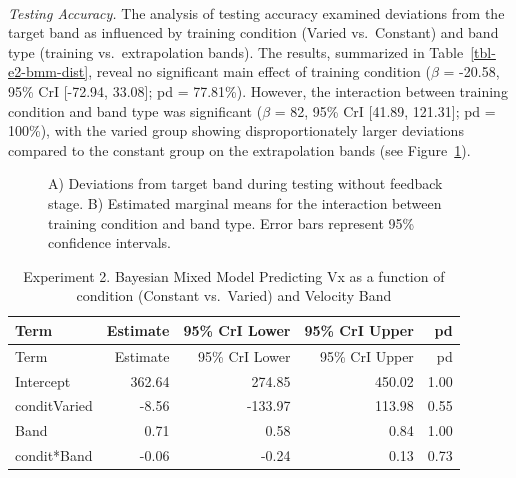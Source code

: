 \documentclass[
  12pt,
  letterpaper,
]{article}
\begin{document}
~\\

\emph{Testing Accuracy.} The analysis of testing accuracy examined
deviations from the target band as influenced by training condition
(Varied vs.~Constant) and band type (training vs.~extrapolation bands).
The results, summarized in Table~\ref{tbl-e2-bmm-dist}, reveal no
significant main effect of training condition (\(\beta\) = -20.58, 95\%
CrI {[}-72.94, 33.08{]}; pd = 77.81\%). However, the interaction between
training condition and band type was significant (\(\beta\) = 82, 95\%
CrI {[}41.89, 121.31{]}; pd = 100\%), with the varied group showing
disproportionately larger deviations compared to the constant group on
the extrapolation bands (see Figure~\ref{fig-e2-test-dev}).

\begin{figure}


\caption{\label{fig-e2-test-dev}A) Deviations from target band during
testing without feedback stage. B) Estimated marginal means for the
interaction between training condition and band type. Error bars
represent 95\% confidence intervals.}

\end{figure}%

\begin{longtable}[]{@{}lrrrr@{}}
\caption{Experiment 2. Bayesian Mixed Model Predicting Vx as a function
of condition (Constant vs.~Varied) and Velocity
Band}\label{tbl-e2-bmm-vx}\tabularnewline
\toprule\noalign{}
Term & Estimate & 95\% CrI Lower & 95\% CrI Upper & pd \\
\midrule\noalign{}
\endfirsthead
\toprule\noalign{}
Term & Estimate & 95\% CrI Lower & 95\% CrI Upper & pd \\
\midrule\noalign{}
\endhead
\bottomrule\noalign{}
\endlastfoot
Intercept & 362.64 & 274.85 & 450.02 & 1.00 \\
conditVaried & -8.56 & -133.97 & 113.98 & 0.55 \\
Band & 0.71 & 0.58 & 0.84 & 1.00 \\
condit*Band & -0.06 & -0.24 & 0.13 & 0.73 \\
\end{longtable}
\end{document}
